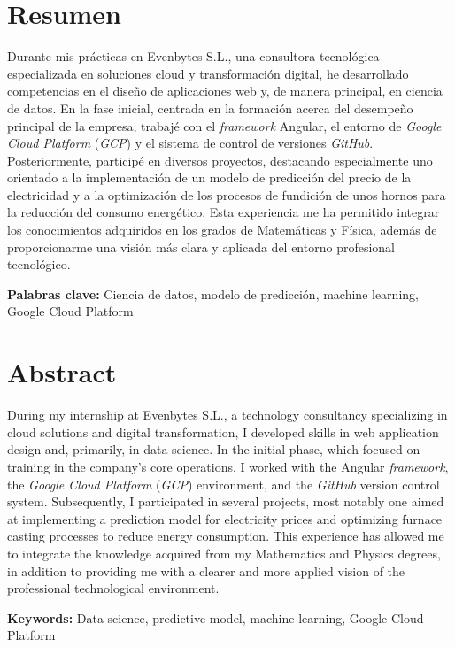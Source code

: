 \section*{Resumen}

Durante mis prácticas en Evenbytes S.L., una consultora tecnológica especializada en soluciones cloud y transformación digital, he desarrollado competencias en el diseño de aplicaciones web y, de manera principal, en ciencia de datos. En la fase inicial, centrada en la formación acerca del desempeño principal de la empresa, trabajé con el \textit{framework} Angular, el entorno de \textit{Google Cloud Platform} (\textit{GCP}) y el sistema de control de versiones \textit{GitHub}. Posteriormente, participé en diversos proyectos, destacando especialmente uno orientado a la implementación de un modelo de predicción del precio de la electricidad y a la optimización de los procesos de fundición de unos hornos para la reducción del consumo energético. Esta experiencia me ha permitido integrar los conocimientos adquiridos en los grados de Matemáticas y Física, además de proporcionarme una visión más clara y aplicada del entorno profesional tecnológico.

\vspace{1cm}
\noindent\textbf{Palabras clave:} Ciencia de datos, modelo de predicción, machine learning, Google Cloud Platform
 

\section*{Abstract}

During my internship at Evenbytes S.L., a technology consultancy specializing in cloud solutions and digital transformation, I developed skills in web application design and, primarily, in data science. In the initial phase, which focused on training in the company's core operations, I worked with the Angular \textit{framework}, the \textit{Google Cloud Platform} (\textit{GCP}) environment, and the \textit{GitHub} version control system. Subsequently, I participated in several projects, most notably one aimed at implementing a prediction model for electricity prices and optimizing furnace casting processes to reduce energy consumption. This experience has allowed me to integrate the knowledge acquired from my Mathematics and Physics degrees, in addition to providing me with a clearer and more applied vision of the professional technological environment.

\vspace{1cm}
\noindent\textbf{Keywords:} Data science,  predictive model, machine learning, Google Cloud Platform

